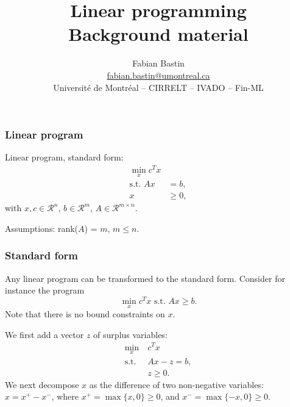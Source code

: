 \documentclass{beamer}
\author[Fabian Bastin]{Fabian Bastin \\ \url{fabian.bastin@umontreal.ca} \\ Université de Montréal -- CIRRELT -- IVADO -- Fin-ML}
\date{}
\title[Linear programming]{Linear programming\\Background material}
\def\rit{\mathcal{R}}
\begin{document}
\frame{\titlepage}

\begin{frame}
\frametitle{Linear program}

Linear program, standard form:
\begin{align*}
\min_x c^Tx \\
\mbox{s.t. } Ax &= b,\\
x &\geq 0,
\end{align*}
with $x, c \in \rit^n$, $b \in \rit^m$, $A \in \rit^{m \times n}$.

\mbox{}

Assumptions: rank($A$) = $m$, $m \leq n$.
\end{frame}

\begin{frame}
\frametitle{Standard form}

Any linear program can be transformed to the standard form.
Consider for instance the program
\[
\min_x c^Tx \mbox{ s.t. } Ax \geq b.
\]
Note that there is no bound constraints on $x$.

\mbox{}

We first add a vector $z$ of surplus variables:
\begin{align*}
\min_x\ & c^Tx \\
\mbox{s.t. } & Ax - z = b,\\
& z \geq 0.
\end{align*}
We next decompose $x$ as the difference of two non-negative variables: $x = x^+-x^-$, where $x^+ = \max \lbrace x,
0 \rbrace \geq 0$, and $x^- = \max \lbrace -x, 0 \rbrace \geq 0$.
\end{frame}
\end{document}
